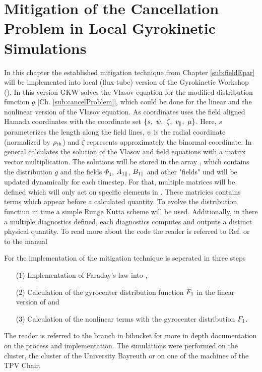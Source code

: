 \chapter{Mitigation of the Cancellation Problem in Local Gyrokinetic Simulations}
\label{chap:methods}

\thispagestyle{empty}
\newpage

In this chapter the established mitigation technique from Chapter \ref{sub:fieldEpar} will be implemented into local (flux-tube) version of the Gyrokinetic Workshop ({\gkw}). In this version GKW solves the Vlasov equation for the modified distribution function $g$ [Ch. \ref{sub:cancelProblem}], which could be done for the linear and the nonlinear version of the Vlasov equation. As coordinates {\gkw} uses the field aligned Hamada coordinates\cite{Hamada1962} with the coordinate set $\{s,~\psi,~\zeta,~v_\parallel,~\mu\}$. Here, $s$ parameterizes the length along the field lines, $\psi$ is the radial coordinate (normalized by $\rho_{\mathrm{th}}$) and $\zeta$ represents approximately the binormal coordinate. In general {\gkw} calculates the solution of the Vlasov and field equations with a matrix vector multiplication. The solutions will be stored in the array , which contains the distribution $g$ and the fields $\Phi_1$, $A_{1\parallel}$, $B_{1\parallel}$ and other "fields" und will be updated dynamically for each timestep. For that, multiple matrices will be defined which will only act on specific elements in . These matricies contains terms which appear before a calculated quantity. To evolve the distribution functiun in time a simple Runge Kutta scheme will be used. Additionally, in {\gkw} there a multiple diagnostics defined, each diagnostics computes and outputs a distinct physical quantity. \cite{GKWManual} To read more about the code {\gkw} the reader is referred to Ref.  or to the manual\cite{GKWManual}
\bigskip

For the implementation of the mitigation technique is seperated in three steps
\begin{itemize}
    \item[(1)] Implementation of Faraday's law into {\gkw},
    \item[(2)] Calculation of the gyrocenter distribution function $F_1$ in the linear version of {\gkw} and
    \item[(3)] Calculation of the nonlinear terms with the gyrocenter distribution $F_1$.
\end{itemize}

The reader is referred to the branch in bibucket\cite{FeatureEparBitbucket} for more in depth documentation on the process and implementation. The simulations were performed on the \cite{emil} cluster, the \cite{festus} cluster of the University Bayreuth or on one of the  machines of the TPV Chair.

\newpage
